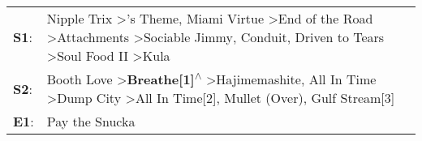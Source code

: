 \begin{supertabular}{p{0.03\textwidth}p{0.92\textwidth}}
 \textbf{S1}:  &  Nipple Trix\textsuperscript{} \textgreater {}'s Theme\textsuperscript{}, \enspace Miami Virtue\textsuperscript{} \textgreater \enspace End of the Road\textsuperscript{} \textgreater \enspace Attachments\textsuperscript{} \textgreater \enspace Sociable Jimmy\textsuperscript{}, \enspace Conduit\textsuperscript{}, \enspace Driven to Tears\textsuperscript{} \textgreater \enspace Soul Food II\textsuperscript{} \textgreater \enspace Kula\textsuperscript{}  \enspace  \\
 \textbf{S2}:  &                                                                                    Booth Love\textsuperscript{} \textgreater \enspace \textbf{Breathe[1]\textsuperscript{$\wedge$}} \textgreater \enspace Hajimemashite\textsuperscript{}, \enspace All In Time\textsuperscript{} \textgreater \enspace Dump City\textsuperscript{} \textgreater \enspace All In Time[2]\textsuperscript{}, \enspace Mullet (Over)\textsuperscript{}, \enspace Gulf Stream[3]\textsuperscript{}  \enspace  \\
 \textbf{E1}:  &                                                                                                                                                                                                                                                                                                                                                                                                                                                Pay the Snucka\textsuperscript{}  \enspace  \\
\end{supertabular}
